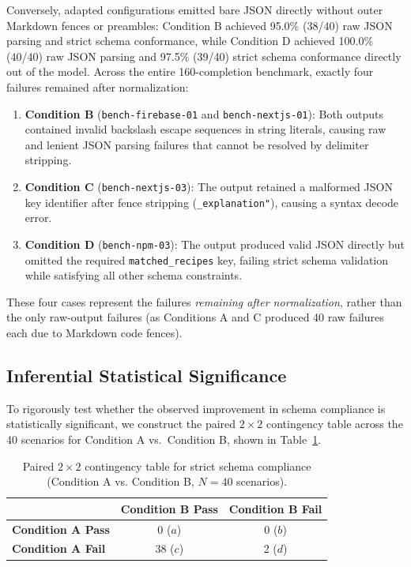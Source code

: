 \documentclass[11pt,a4paper]{article}
\begin{document}
Conversely, adapted configurations emitted bare JSON directly without outer Markdown fences or preambles: Condition B achieved 95.0\% (38/40) raw JSON parsing and strict schema conformance, while Condition D achieved 100.0\% (40/40) raw JSON parsing and 97.5\% (39/40) strict schema conformance directly out of the model. Across the entire 160-completion benchmark, exactly four failures remained after normalization:
\begin{enumerate}
    \item \textbf{Condition B} (\texttt{bench-firebase-01} and \texttt{bench-nextjs-01}): Both outputs contained invalid backslash escape sequences in string literals, causing raw and lenient JSON parsing failures that cannot be resolved by delimiter stripping.
    \item \textbf{Condition C} (\texttt{bench-nextjs-03}): The output retained a malformed JSON key identifier after fence stripping (\texttt{\_explanation"}), causing a syntax decode error.
    \item \textbf{Condition D} (\texttt{bench-npm-03}): The output produced valid JSON directly but omitted the required \texttt{matched\_recipes} key, failing strict schema validation while satisfying all other schema constraints.
\end{enumerate}
These four cases represent the failures \emph{remaining after normalization}, rather than the only raw-output failures (as Conditions A and C produced 40 raw failures each due to Markdown code fences).

\subsection{Inferential Statistical Significance}

To rigorously test whether the observed improvement in schema compliance is statistically significant, we construct the paired $2 \times 2$ contingency table across the 40 scenarios for Condition A vs.\ Condition B, shown in Table~\ref{tab:paired_contingency}.

\begin{table}[h]
\centering
\setlength{\tabcolsep}{10pt}
\renewcommand{\arraystretch}{1.2}
\begin{tabular}{lcc}
\toprule
& \textbf{Condition B Pass} & \textbf{Condition B Fail} \\
\midrule
\textbf{Condition A Pass} & 0 ($a$) & 0 ($b$) \\
\textbf{Condition A Fail} & 38 ($c$) & 2 ($d$) \\
\bottomrule
\end{tabular}
\caption{Paired $2 \times 2$ contingency table for strict schema compliance (Condition A vs. Condition B, $N=40$ scenarios).}
\label{tab:paired_contingency}
\end{table}
\end{document}
